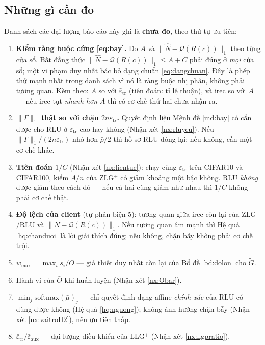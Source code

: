 \documentclass[11pt,a4paper]{article}
\theoremstyle{remark}
\newcommand{\quant}{\mathcal{Q}}
\newcommand{\epstr}{\bar\varepsilon_{\mathrm{tr}}}
\newcommand{\epsaux}{\bar\varepsilon_{\mathrm{aux}}}
\begin{document}
\subsection{Những gì cần đo}

Danh sách các đại lượng báo cáo này ghi là \textbf{chưa đo}, theo thứ tự ưu
tiên:

\begin{enumerate}
\item \textbf{Kiểm ràng buộc cứng \eqref{eq:bay}.} Đo $A$ và
  $\|\hat N-\quant(R(c))\|_1$ theo từng cửa sổ. Bất đẳng thức
  $\|\hat N-\quant(R(c))\|_1\le A+C$ phải đúng ở \emph{mọi} cửa sổ; một vi
  phạm duy nhất bác bỏ dạng chuẩn \eqref{eq:dangchuan}. Đây là phép thử mạnh
  nhất trong danh sách vì nó là ràng buộc nhị phân, không phải tương quan.
  Kèm theo: $A$ so với $\epstr$ (tiên đoán: tỉ lệ thuận), và irec so với $A$
  --- nếu irec tụt \emph{nhanh hơn} $A$ thì có cơ chế thứ hai chưa nhận ra.

\item \textbf{$\|\Gamma\|_1$ thật so với chặn $2n\epstr$.} Quyết định liệu
  Mệnh đề \ref{md:bay} có cắn được cho RLU ở $\epstr$ cao hay không (Nhận xét
  \ref{nx:rluyeu}). Nếu $\|\Gamma\|_1/(2n\epstr)$ nhỏ hơn $\bar\rho/2$ thì hồ
  sơ RLU đóng lại; nếu không, cần một cơ chế khác.

\item \textbf{Tiên đoán $1/C$} (Nhận xét \ref{nx:lientuc}): chạy cùng
  $\epstr$ trên CIFAR10 và CIFAR100, kiểm $A/n$ của ZLG$^+$ có giảm khoảng
  một bậc không. RLU \emph{không} được giảm theo cách đó --- nếu cả hai cùng
  giảm như nhau thì $1/C$ không phải cơ chế thật.

\item \textbf{Độ lệch của client} (tự phản biện 5): tương quan giữa irec còn
  lại của ZLG$^+$/RLU và $\|N-\quant(R(c))\|_1$. Nếu tương quan âm mạnh thì
  Hệ quả \ref{hq:chanduoi} là lời giải thích đúng; nếu không, chặn bẫy không
  phải cơ chế trội.
\item $w_{\max}=\max_i s_i/\bar O$ --- giả thiết duy nhất còn lại của Bổ đề
  \ref{bd:dolon} cho $\tilde G$.
\item Hành vi của $\bar O$ khi huấn luyện (Nhận xét \ref{nx:Obar}).
\item $\min_j\mathrm{softmax}(\bar\mu)_j$ --- chỉ quyết định dạng affine
  \emph{chính xác} của RLU có dùng được không (Hệ quả \ref{hq:nguong}); không
  ảnh hưởng chặn bẫy (Nhận xét \ref{nx:vaitroH2}), nên ưu tiên thấp.
\item $\epstr/\epsaux$ --- đại lượng điều khiển của LLG$^+$ (Nhận xét
  \ref{nx:llgpratio}).
\end{enumerate}
\end{document}
